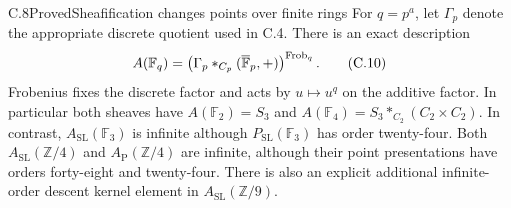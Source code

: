 \begin{statement}{C.8}{Proved}{Sheafification changes points over finite rings}
For $q=p^a$, let $\Gamma_p$ denote the appropriate discrete quotient
used in C.4. There is an exact description
\[
 A(\mathbb F_q)=
 \left(\Gamma_p*_{C_p}(\overline{\mathbb F}_p,+)\right)^{{\rm Frob}_q}.
                                                                    \tag{C.10}
\]
Frobenius fixes the discrete factor and acts by $u\mapsto u^q$
on the additive factor. In particular both sheaves have
$A(\mathbb F_2)=S_3$ and
$A(\mathbb F_4)=S_3*_{C_2}(C_2\times C_2)$.
In contrast, $A_{\mathrm{SL}}(\mathbb F_3)$ is infinite although
$P_{\mathrm{SL}}(\mathbb F_3)$ has order twenty-four.
Both $A_{\mathrm{SL}}(\mathbb Z/4)$ and $A_{\mathrm P}(\mathbb Z/4)$
are infinite, although their point presentations have orders
forty-eight and twenty-four. There is also an explicit additional
infinite-order descent kernel element in
$A_{\mathrm{SL}}(\mathbb Z/9)$.
\end{statement}
